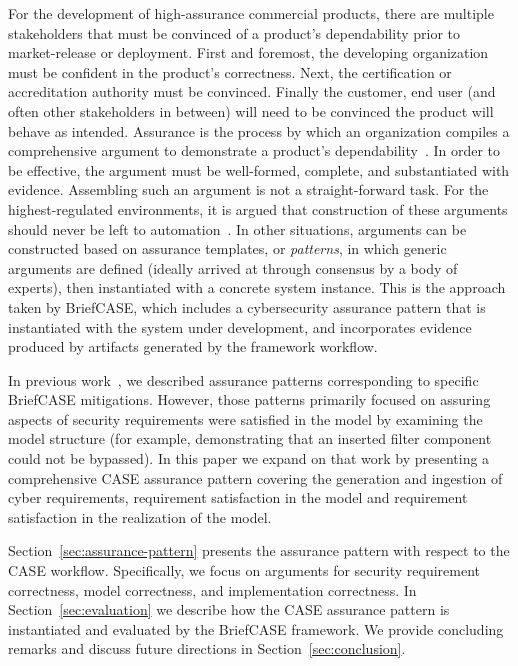 For the development of high-assurance commercial products, there are multiple stakeholders that must be convinced of a product's dependability prior to market-release or deployment.  First and foremost, the developing organization must be confident in the product's correctness.  Next, the certification or accreditation authority must be convinced.  Finally the customer, end user (and often other stakeholders in between) will need to be convinced the product will behave as intended.  Assurance is the process by which an organization compiles a comprehensive argument to demonstrate a product's dependability~\cite{???}.  In order to be effective, the argument must be well-formed, complete, and substantiated with evidence.  Assembling such an argument is not a straight-forward task.  For the highest-regulated environments, it is argued that construction of these arguments should never be left to automation~\cite{???-Holloway}.  In other situations, arguments can be constructed based on assurance templates, or \textit{patterns}, in which generic arguments are defined (ideally arrived at through consensus by a body of experts), then instantiated with a concrete system instance.  This is the approach taken by BriefCASE, which includes a cybersecurity assurance pattern that is instantiated with the system under development, and incorporates evidence produced by artifacts generated by the framework workflow.



In previous work~\cite{resolute-destion}, we described assurance patterns corresponding to specific BriefCASE mitigations.  However, those patterns primarily focused on assuring aspects of security requirements were satisfied in the model by examining the model structure (for example, demonstrating that an inserted filter component could not be bypassed).  
%
In this paper we expand on that work by presenting a comprehensive CASE assurance pattern covering the generation and ingestion of cyber requirements, requirement satisfaction in the model and requirement satisfaction in the realization of the model.  

Section~\ref{sec:assurance-pattern} presents the assurance pattern with respect to the CASE workflow. Specifically, we focus on arguments for security requirement correctness, model correctness, and implementation correctness.  In Section~\ref{sec:evaluation} we describe how the CASE assurance pattern is instantiated and evaluated by the BriefCASE framework.  We provide concluding remarks and discuss future directions in Section~\ref{sec:conclusion}.